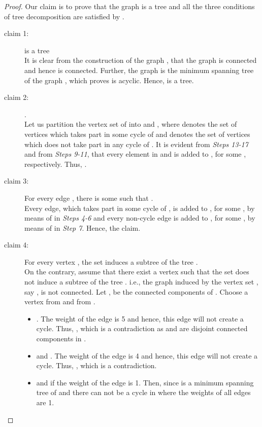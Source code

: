 \documentclass[runningheads]{llncs}
\begin{document}
\begin{proof}
 Our claim is to prove that the graph  is a tree and all the three conditions of tree decomposition are satisfied by .
\begin{description}
\item[claim 1:]  is a tree \\
It is clear from the construction of the graph , that the graph  is connected and hence  is connected. Further, the graph  is the minimum spanning tree of the graph , which proves  is acyclic. Hence,  is a tree.
\item[claim 2:] . \\
Let us partition the vertex set of  into  and , where  denotes the set of vertices which takes part in some cycle of  and  denotes the set of vertices which does not take part in any cycle of . It is evident from \emph{Steps 13-17} and from \emph{Steps 9-11}, that every element in  and  is added to , for some , respectively. Thus, . 

\item[claim 3:] For every edge , there is some  such that . \\
Every edge, which takes part in some cycle of , is added to , for some , by means of  in \emph{Steps 4-6} and every non-cycle edge is added to , for some , by means of  in \emph{Step 7}. Hence, the claim.


\item[claim 4:] For every vertex , the set  induces a subtree of the tree .\\
On the contrary, assume that there exist a vertex  such that the set  does not induce a subtree of the tree . i.e., the graph induced by the vertex set , say , is not connected. Let ,  be the connected components of . Choose a vertex  from  and  from . 
\begin{itemize}
\item[] . The weight of the edge  is 5 and hence, this edge will not create a cycle. Thus, , which is a contradiction as  and  are disjoint connected components in .
\item[]  and . The weight of the edge  is 4 and hence, this edge will not create a cycle. Thus, , which is a contradiction.
\item[]  and if the weight of the edge  is 1. Then,  since  is a minimum spanning tree of  and there can not be a cycle in  where the weights of all edges are 1.
 

\end{itemize}
\end{description}
\end{proof}
\end{document}
